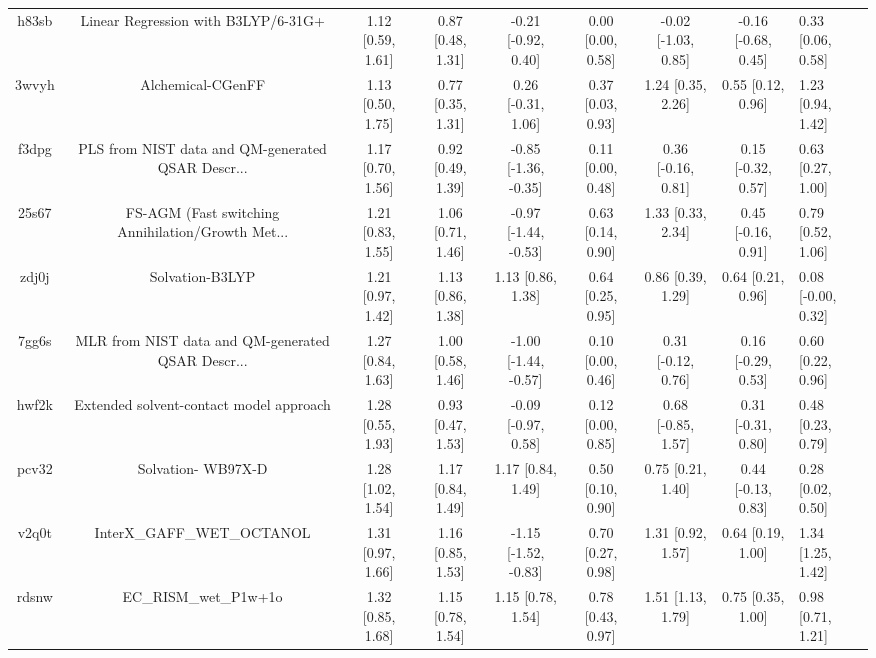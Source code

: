 \documentclass{article}
\begin{document}
\begin{center}
\begin{longtable}{|cccccccc|}
 h83sb &                Linear Regression with B3LYP/6-31G+ &  1.12 [0.59, 1.61] &  0.87 [0.48, 1.31] &   -0.21 [-0.92, 0.40] &  0.00 [0.00, 0.58] &  -0.02 [-1.03, 0.85] &  -0.16 [-0.68, 0.45] &     0.33 [0.06, 0.58] \\
 3wvyh &                                  Alchemical-CGenFF &  1.13 [0.50, 1.75] &  0.77 [0.35, 1.31] &    0.26 [-0.31, 1.06] &  0.37 [0.03, 0.93] &    1.24 [0.35, 2.26] &    0.55 [0.12, 0.96] &     1.23 [0.94, 1.42] \\
 f3dpg &  PLS from NIST data and QM-generated QSAR Descr... &  1.17 [0.70, 1.56] &  0.92 [0.49, 1.39] &  -0.85 [-1.36, -0.35] &  0.11 [0.00, 0.48] &   0.36 [-0.16, 0.81] &   0.15 [-0.32, 0.57] &     0.63 [0.27, 1.00] \\
 25s67 &  FS-AGM (Fast switching Annihilation/Growth Met... &  1.21 [0.83, 1.55] &  1.06 [0.71, 1.46] &  -0.97 [-1.44, -0.53] &  0.63 [0.14, 0.90] &    1.33 [0.33, 2.34] &   0.45 [-0.16, 0.91] &     0.79 [0.52, 1.06] \\
 zdj0j &                                    Solvation-B3LYP &  1.21 [0.97, 1.42] &  1.13 [0.86, 1.38] &     1.13 [0.86, 1.38] &  0.64 [0.25, 0.95] &    0.86 [0.39, 1.29] &    0.64 [0.21, 0.96] &    0.08 [-0.00, 0.32] \\
 7gg6s &  MLR from NIST data and QM-generated QSAR Descr... &  1.27 [0.84, 1.63] &  1.00 [0.58, 1.46] &  -1.00 [-1.44, -0.57] &  0.10 [0.00, 0.46] &   0.31 [-0.12, 0.76] &   0.16 [-0.29, 0.53] &     0.60 [0.22, 0.96] \\
 hwf2k &            Extended solvent-contact model approach &  1.28 [0.55, 1.93] &  0.93 [0.47, 1.53] &   -0.09 [-0.97, 0.58] &  0.12 [0.00, 0.85] &   0.68 [-0.85, 1.57] &   0.31 [-0.31, 0.80] &     0.48 [0.23, 0.79] \\
 pcv32 &                                 Solvation- WB97X-D &  1.28 [1.02, 1.54] &  1.17 [0.84, 1.49] &     1.17 [0.84, 1.49] &  0.50 [0.10, 0.90] &    0.75 [0.21, 1.40] &   0.44 [-0.13, 0.83] &     0.28 [0.02, 0.50] \\
 v2q0t &                         InterX\_GAFF\_WET\_OCTANOL &  1.31 [0.97, 1.66] &  1.16 [0.85, 1.53] &  -1.15 [-1.52, -0.83] &  0.70 [0.27, 0.98] &    1.31 [0.92, 1.57] &    0.64 [0.19, 1.00] &     1.34 [1.25, 1.42] \\
 rdsnw &                              EC\_RISM\_wet\_P1w+1o &  1.32 [0.85, 1.68] &  1.15 [0.78, 1.54] &     1.15 [0.78, 1.54] &  0.78 [0.43, 0.97] &    1.51 [1.13, 1.79] &    0.75 [0.35, 1.00] &     0.98 [0.71, 1.21] \\

\end{longtable}
\end{center}
\end{document}
